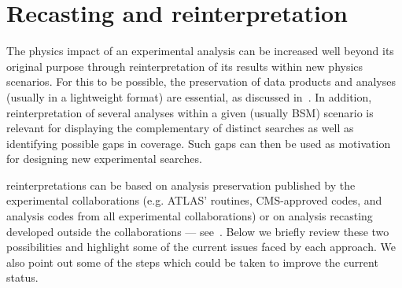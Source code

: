 \documentclass[11pt]{article}
\begin{document}
\section{Recasting and reinterpretation}
\label{reinterpret}

The physics impact of an experimental analysis can be increased well beyond its original purpose through \gls{reinterpretation} of its results within new physics scenarios.
For this to be possible, the preservation of \glspl{data product} and analyses (usually in a lightweight format) are essential, as discussed in~.
In addition, reinterpretation of several analyses within a given (usually \gls{BSM}) scenario is relevant for displaying the complementary of distinct searches as well as identifying possible gaps in coverage.
Such gaps can then be used as motivation for designing new experimental searches.


\Glspl{reinterpretation} can be based on \gls{analysis preservation} published by the experimental collaborations (e.g. ATLAS' \simpleanalysis routines, \gls{CMS}-approved \madanalysis codes, and \rivet analysis codes from all experimental collaborations) or on analysis recasting developed outside the collaborations --- see~. Below we briefly review these two possibilities and highlight some of the current issues faced by each approach.
We also point out some of the steps which could be taken to improve the current status.






\end{document}
